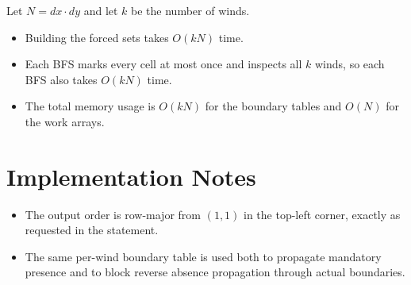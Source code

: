 \documentclass[11pt]{article}
\begin{document}
Let $N = dx \cdot dy$ and let $k$ be the number of winds.

\begin{itemize}[leftmargin=*]
    \item Building the forced sets takes $O(kN)$ time.
    \item Each BFS marks every cell at most once and inspects all $k$ winds, so each BFS also takes $O(kN)$ time.
    \item The total memory usage is $O(kN)$ for the boundary tables and $O(N)$ for the work arrays.
\end{itemize}

\section*{Implementation Notes}

\begin{itemize}[leftmargin=*]
    \item The output order is row-major from $(1,1)$ in the top-left corner, exactly as requested in the
    statement.
    \item The same per-wind boundary table is used both to propagate mandatory presence and to block
    reverse absence propagation through actual boundaries.
\end{itemize}
\end{document}
